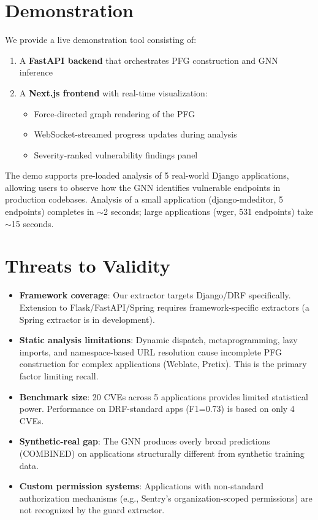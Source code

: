\documentclass[conference]{IEEEtran}
\begin{document}
\section{Demonstration}

We provide a live demonstration tool consisting of:

\begin{enumerate}
    \item A \textbf{FastAPI backend} that orchestrates PFG construction and GNN inference
    \item A \textbf{Next.js frontend} with real-time visualization:
    \begin{itemize}
        \item Force-directed graph rendering of the PFG
        \item WebSocket-streamed progress updates during analysis
        \item Severity-ranked vulnerability findings panel
    \end{itemize}
\end{enumerate}

The demo supports pre-loaded analysis of 5 real-world Django applications, allowing users to observe how the GNN identifies vulnerable endpoints in production codebases. Analysis of a small application (django-mdeditor, 5 endpoints) completes in $\sim$2 seconds; large applications (wger, 531 endpoints) take $\sim$15 seconds.

\section{Threats to Validity}

\begin{itemize}
    \item \textbf{Framework coverage}: Our extractor targets Django/DRF specifically. Extension to Flask/FastAPI/Spring requires framework-specific extractors (a Spring extractor is in development).
    \item \textbf{Static analysis limitations}: Dynamic dispatch, metaprogramming, lazy imports, and namespace-based URL resolution cause incomplete PFG construction for complex applications (Weblate, Pretix). This is the primary factor limiting recall.
    \item \textbf{Benchmark size}: 20 CVEs across 5 applications provides limited statistical power. Performance on DRF-standard apps (F1=0.73) is based on only 4 CVEs.
    \item \textbf{Synthetic-real gap}: The GNN produces overly broad predictions (COMBINED) on applications structurally different from synthetic training data.
    \item \textbf{Custom permission systems}: Applications with non-standard authorization mechanisms (e.g., Sentry's organization-scoped permissions) are not recognized by the guard extractor.
\end{itemize}
\end{document}
